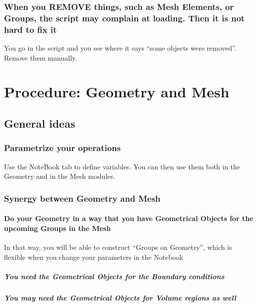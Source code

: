 \documentclass[10pt]{book}
\begin{document}
  
    \subsection{When you REMOVE things, such as Mesh Elements, or Groups, the script may complain at loading. Then it is not hard to fix it}
    
    
    You go in the script and you see where it says ``some objects were removed''.
    Remove them manually.
  
  
  
  
 \chapter{Procedure: Geometry and Mesh}

   \section{General ideas}
   
   
 \subsection{Parametrize your operations}

    Use the NoteBook tab to define variables. You can then use them both in the Geometry and in the Mesh modules.

 \subsection{Synergy between Geometry and Mesh}
 
 
 \subsubsection{Do your Geometry in a way that you have Geometrical Objects for the upcoming Groups in the Mesh}
 
  In that way, you will be able to construct ``Groups on Geometry'', which is flexible when you change your parameters in the Notebook
  
  \paragraph{You need the Geometrical Objects for the Boundary conditions}
 
  \paragraph{You may need the Geometrical Objects for Volume regions as well}
  
\end{document}
